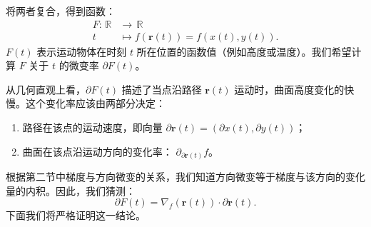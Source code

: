 \documentclass[12pt,UTF8,fontset=none]{ctexbook}
\begin{document}
将两者复合，得到函数：
\begin{align*}
    F: \,\mathbb{R} &\to\, \mathbb{R}\\
    t\, &\mapsto f(\mathbf{r}(t)) = f(x(t), y(t)).
\end{align*}
$F(t)$ 表示运动物体在时刻 $t$ 所在位置的函数值（例如高度或温度）。我们希望计算 $F$ 关于 $t$ 的微变率 $\partial F(t)$。


从几何直观上看，$\partial F(t)$ 描述了当点沿路径 $\mathbf{r}(t)$ 运动时，曲面高度变化的快慢。这个变化率应该由两部分决定：
\begin{enumerate}[label=\arabic*.]
\item 路径在该点的运动速度，即向量 $\partial\mathbf{r}(t) = \left(\partial x(t), \partial y(t)\right)$；
\item 曲面在该点沿运动方向的变化率： $\partial_{\partial\mathbf{r}(t)} f$。
\end{enumerate}
根据第二节中梯度与方向微变的关系，我们知道方向微变等于梯度与该方向的变化量的内积。因此，我们猜测：
$$ \partial F(t) = \nabla_f(\mathbf{r}(t)) \cdot \partial\mathbf{r}(t). $$
下面我们将严格证明这一结论。
\end{document}
